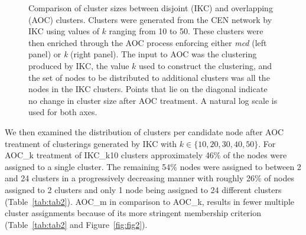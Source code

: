 \documentclass[12pt, oneside]{article}   	%
\begin{document}
\begin{figure}[H]
\begin{subfigure}[t]{0.48\textwidth}
    	\end{subfigure}
\captionsetup{width=0.9\textwidth}	
\caption{Comparison of cluster sizes between disjoint (IKC)  and overlapping (AOC) clusters. Clusters were generated from the CEN network by IKC using values of $k$ ranging from 10 to 50. These clusters were then enriched through the AOC process enforcing either \emph{mcd} (left panel) or \emph{k} (right panel). The input to AOC was the  clustering produced by IKC, the value $k$ used to construct the clustering, and the set of nodes to be distributed to additional clusters was all the nodes in the IKC clusters.  Points that lie on the diagonal indicate no change in cluster size after AOC treatment. A natural log scale is used for both axes.}
\label{fig:fig1}
\end{figure}

We then examined the distribution of clusters per candidate node after AOC treatment of clusterings generated by  IKC with $k \in \{10, 20, 30, 40, 50\}$. For AOC\_k treatment of IKC\_k10 clusters approximately 46\% of the nodes were assigned to a single cluster. The remaining 54\% nodes were assigned to between 2 and 24 clusters in a progressively decreasing manner with roughly 26\% of nodes assigned to 2 clusters and only 1 node being assigned to 24 different clusters (Table~\ref{tab:tab2}). AOC\_m in comparison to AOC\_k, results in fewer multiple cluster assignments because of its more stringent membership criterion (Table~\ref{tab:tab2} and Figure~\ref{fig:fig2}).
\end{document}
